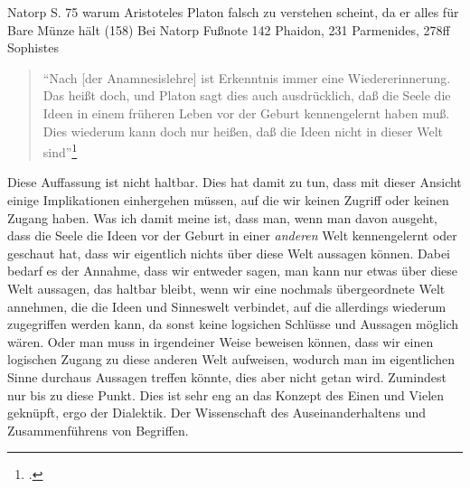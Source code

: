 \documentclass[12pt]{article}
\newcommand*{\zitatblock}[1]{%
    \begin{quote}
    \fontsize{10}{12}\selectfont
    \setlength{\parskip}{1.0em}
    #1
    \end{quote}
}
\begin{document}
Natorp S. 75 warum Aristoteles Platon falsch zu verstehen scheint, da er alles für Bare Münze hält (158) Bei Natorp Fußnote 142 Phaidon, 231 Parmenides, 278ff Sophistes
\zitatblock{\enquote{Nach [der Anamnesislehre] ist Erkenntnis immer eine Wiedererinnerung. Das heißt doch, und Platon sagt dies auch ausdrücklich, daß die Seele die Ideen in einem früheren Leben vor der Geburt kennengelernt haben muß. Dies wiederum kann doch nur heißen, daß die Ideen nicht in dieser Welt sind}\footcite[][S. 160]{Martin73}}
Diese Auffassung ist nicht haltbar. Dies hat damit zu tun, dass mit dieser Ansicht einige Implikationen einhergehen müssen, auf die wir keinen Zugriff oder keinen Zugang haben. Was ich damit meine ist, dass man, wenn man davon ausgeht, dass die Seele die Ideen vor der Geburt in einer \emph{anderen} Welt kennengelernt oder geschaut hat, dass wir eigentlich nichts über diese Welt aussagen können. Dabei bedarf es der Annahme, dass wir entweder sagen, man kann nur etwas über diese Welt aussagen, das haltbar bleibt, wenn wir eine nochmals übergeordnete Welt annehmen, die die Ideen und Sinneswelt verbindet, auf die allerdings wiederum zugegriffen werden kann, da sonst keine logsichen Schlüsse und Aussagen möglich wären. Oder man muss in irgendeiner Weise beweisen können, dass wir einen logischen Zugang zu diese anderen Welt aufweisen, wodurch man im eigentlichen Sinne durchaus Aussagen treffen könnte, dies aber nicht getan wird. Zumindest nur bis zu diese Punkt.
Dies ist sehr eng an das Konzept des Einen und Vielen geknüpft, ergo der Dialektik. Der Wissenschaft des Auseinanderhaltens und Zusammenführens von Begriffen.
\end{document}
